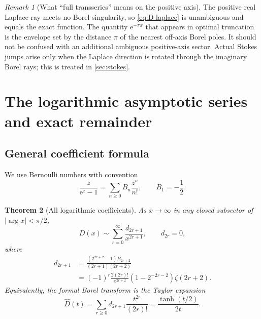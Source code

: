 \documentclass[11pt,a4paper]{article}
\numberwithin{equation}{section}
\newtheorem{theorem}{Theorem}[section]
\theoremstyle{definition}
\theoremstyle{remark}
\newtheorem{remark}[theorem]{Remark}
\newcommand{\e}{\mathrm e}
\begin{document}
\begin{remark}[What ``full transseries'' means on the positive axis]
The positive real Laplace ray meets no Borel singularity, so
\cref{eq:D-laplace} is unambiguous and equals the exact function.  The
quantity \(\e^{-\pi x}\) that appears in optimal truncation is the envelope
set by the distance \(\pi\) of the nearest off-axis Borel poles.  It should
not be confused with an additional ambiguous positive-axis sector.  Actual
Stokes jumps arise only when the Laplace direction is rotated through the
imaginary Borel rays; this is treated in \cref{sec:stokes}.
\end{remark}

\section{The logarithmic asymptotic series and exact remainder}

\subsection{General coefficient formula}

We use Bernoulli numbers with convention
\begin{equation}\label{eq:Bernoulli-convention}
 \frac{z}{\e^z-1}=\sum_{n\ge0}B_n\frac{z^n}{n!},
 \qquad B_1=-\frac12.
\end{equation}

\begin{theorem}[All logarithmic coefficients]\label{thm:d-coefficients}
As \(x\to\infty\) in any closed subsector of \(|\arg x|<\pi/2\),
\begin{equation}\label{eq:D-asymptotic}
 D(x)\sim\sum_{r=0}^\infty\frac{d_{2r+1}}{x^{2r+1}},
 \qquad d_{2r}=0,
\end{equation}
where
\begin{align}
 d_{2r+1}
 &=\frac{(2^{2r+2}-1)B_{2r+2}}
        {(2r+1)(2r+2)}\label{eq:d-Bernoulli}\\
 &=(-1)^r\frac{2(2r)!}{\pi^{2r+2}}
       \left(1-2^{-2r-2}\right)\zeta(2r+2).
       \label{eq:d-zeta}
\end{align}
Equivalently, the formal Borel transform is the Taylor expansion
\begin{equation}\label{eq:Borel-Taylor}
 \widehat D(t)=\sum_{r\ge0}d_{2r+1}\frac{t^{2r}}{(2r)!}
 =\frac{\tanh(t/2)}{2t}.
\end{equation}
\end{theorem}
\end{document}

